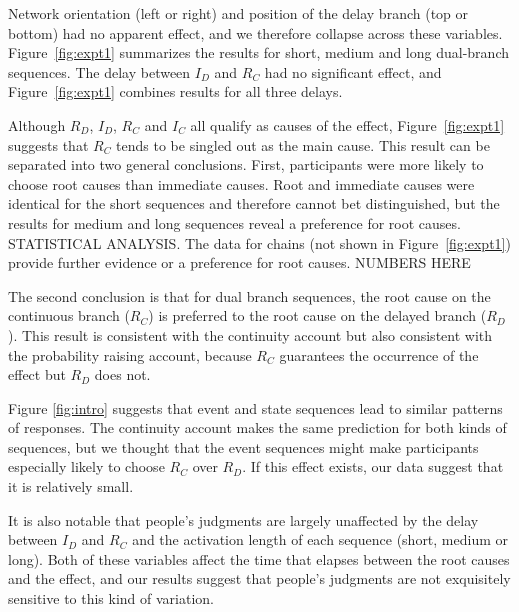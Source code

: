 \documentclass[10pt,letterpaper]{article}
\newcommand{\ev}[2]{$#1_#2$}
\begin{document}
Network orientation (left or right) and position of the delay branch (top or bottom) had no apparent effect, and we therefore collapse across these variables. Figure~\ref{fig:expt1} summarizes the results for short, medium and long dual-branch sequences. The delay between \ev{I}{D} and \ev{R}{C} had no significant effect, and Figure~\ref{fig:expt1} combines results for all three delays.  

Although \ev{R}{D}, \ev{I}{D}, \ev{R}{C} and \ev{I}{C} all qualify as causes of the effect, Figure~\ref{fig:expt1} suggests that \ev{R}{C} tends to be singled out as the main cause. This result can be separated into two general conclusions.  First,  participants were more likely to choose root causes than immediate causes. Root and immediate causes were identical for the short sequences and therefore cannot bet distinguished, but the results for medium and long sequences reveal a preference for root causes. STATISTICAL ANALYSIS. The data for chains (not shown in Figure~\ref{fig:expt1}) provide further evidence or a preference for root causes. NUMBERS HERE

The second conclusion is that for dual branch sequences, the root cause on the continuous branch (\ev{R}{C}) is preferred to the root cause on the delayed branch (\ev{R}{D}). This result is consistent with the continuity account but also consistent with the probability raising account, because \ev{R}{C} guarantees the occurrence of the effect but \ev{R}{D} does not. 

Figure \ref{fig:intro} suggests that event and state sequences lead to similar patterns of responses. The continuity account makes the same prediction for both kinds of sequences, but we thought that the event sequences might make participants especially likely to choose \ev{R}{C} over \ev{R}{D}. If this effect exists, our data suggest that it is relatively small.

It is also notable that people's judgments are largely unaffected by the delay between \ev{I}{D} and \ev{R}{C} and the activation length of each sequence (short, medium or long). Both of these variables affect the time that elapses between the root causes and the effect, and our results suggest that people's judgments are not exquisitely sensitive to this kind of variation.
\end{document}

